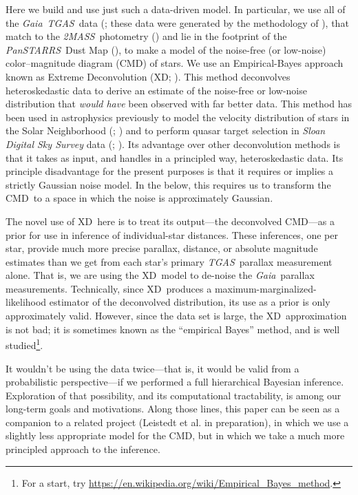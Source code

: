 \documentclass[modern]{aastex61}
\newcommand{\acronym}[1]{{\small{#1}}}
\newcommand{\project}[1]{\textsl{#1}}
\newcommand{\tgas}{\project{\acronym{TGAS}}}
\newcommand{\tmass}{\project{\acronym{2MASS}}}
\newcommand{\gaia}{\project{Gaia}}
\newcommand{\panstarrs}{\project{Pan\acronym{STARRS}}}
\newcommand{\xd}{\acronym{XD}}
\newcommand{\cmd}{\acronym{CMD}}
\begin{document}
Here we build and use just such a data-driven model. In particular,
we use all of the \gaia\ \tgas\ data (\citealt{tgas};
these data were generated by the methodology of \citealt{michalik15}), that match to the
\tmass\ photometry (\citealt{skrutskie06}) and lie in the footprint of
the \panstarrs\ Dust Map (\citealt{green15}), to make a model of the
noise-free (or low-noise) color--magnitude diagram (\cmd) of stars.
We use an Empirical-Bayes approach known as Extreme Deconvolution (XD;
\citealt{bovy11}).
This method deconvolves heteroskedastic data to derive an
estimate of the noise-free or low-noise distribution that \emph{would
  have} been observed with far better data.
This method has been used in astrophysics
previously to model the velocity distribution of stars in the Solar
Neighborhood (\citealt{hogg05}; \citealt{bovy09}) and to
perform quasar target selection
in \project{Sloan Digital Sky Survey} data (\citealt{xdqso}; \citealt{xdqsoz}).
Its advantage over other deconvolution methods is that it takes as input,
and handles in a principled way, heteroskedastic data.
Its principle disadvantage for the present purposes is that it requires
or implies a strictly Gaussian noise model.
In the below, this requires us to transform the \cmd\ to a space in which
the noise is approximately Gaussian.

The novel use of \xd\ here is to treat its output---the deconvolved \cmd---as
a prior for use in inference of individual-star distances.
These inferences, one per star, provide much more precise parallax, distance,
or absolute magnitude estimates than we get from each star's primary
\tgas\ parallax measurement alone.
That is, we are using the \xd\ model to de-noise the \gaia\ parallax
measurements.
Technically, since \xd\ produces a maximum-marginalized-likelihood estimator
of the deconvolved distribution,
its use as a prior is only approximately valid.
However, since the data set is large, the \xd\ approximation is not bad; it is
sometimes known as the ``empirical Bayes'' method, and is well studied\footnote{For a start, try \url{https://en.wikipedia.org/wiki/Empirical_Bayes_method}.}.

It wouldn't be using the data twice---that is, it would be valid from a
probabilistic perspective---if we performed a full hierarchical Bayesian
inference.
Exploration of that possibility, and its computational tractability,
is among our long-term goals and motivations.
Along those lines, this paper can be seen as a companion to a related
project (Leistedt et al. in preparation), in which we use a slightly less appropriate
model for the \cmd, but in which we take a much more principled
approach to the inference.
\end{document}
